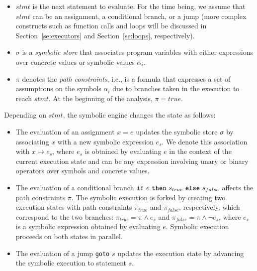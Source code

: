 \begin{itemize}

\item $stmt$ is the next statement to evaluate. For the time being, we assume that $stmt$ can be an assignment, a conditional branch, or a jump (more complex constructs such as function calls and loops will be discussed in  Section~\ref{se:executors} and Section~\ref{se:loops}, respectively).


\item $\sigma$ is a {\em symbolic store} that associates program variables with either expressions over concrete values or symbolic values $\alpha_i$.

\item $\pi$ denotes the {\em path constraints}, i.e., is a formula that expresses a set of assumptions on the symbols $\alpha_i$ due to branches taken in the execution to reach $stmt$. At the beginning of the analysis, $\pi=true$.

\end{itemize}

\noindent Depending on $stmt$, the symbolic engine changes the state as follows:

\begin{itemize}
  \item The evaluation of an assignment $x=e$ updates the symbolic store $\sigma$ by associating $x$ with a new symbolic expression $e_s$. We denote this association with $x\mapsto e_s$, where $e_s$ is obtained by evaluating $e$ in the context of the current execution state and  can be any expression involving unary or binary operators over symbols and concrete values.
  

  \item The evaluation of a conditional branch ${\tt if}~e~{\tt then}~s_{true}~{\tt else}~s_{false}$ affects the path constraints $\pi$. The symbolic execution is forked by creating two execution states with path constraints $\pi_{true}$ and $\pi_{false}$, respectively, which correspond to the two branches: $\pi_{true}=\pi \wedge e_s$ and $\pi_{false}=\pi \wedge \neg e_s$, where $e_s$ is a symbolic expression obtained by evaluating $e$. 
    Symbolic execution proceeds on both states in parallel.

  \item The evaluation of a jump {\tt goto} $s$ updates the execution state by advancing the symbolic execution to statement $s$. 
\end{itemize}


